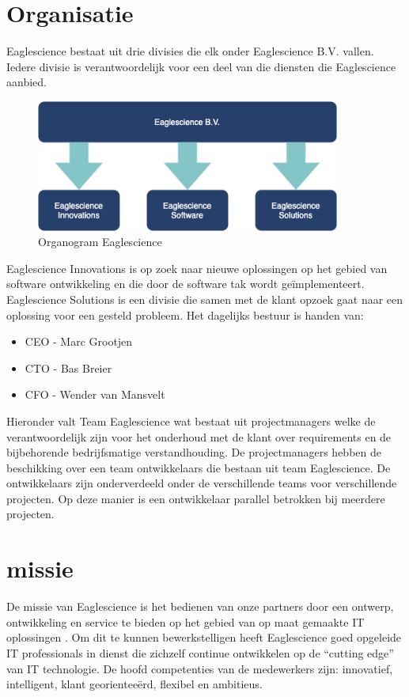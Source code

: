 \section{Organisatie}
Eaglescience bestaat uit drie divisies die elk onder Eaglescience B.V. vallen. Iedere divisie is verantwoordelijk voor een deel van die diensten die Eaglescience aanbied. 
\begin{figure}[bth]
\myfloatalign
\includegraphics[width=10cm]{gfx/organogram}
\caption{Organogram Eaglescience}
\label{fig:Eaglescience organogram}
\end{figure}
Eaglescience Innovations is op zoek naar nieuwe oplossingen op het gebied van software ontwikkeling en  die door de software tak wordt ge\"implementeert. Eaglescience Solutions is een divisie die samen met de klant opzoek gaat naar 
een oplossing voor een gesteld probleem.  
Het dagelijks bestuur is handen van: 
\begin{itemize}
\item CEO - Marc Grootjen
\item CTO - Bas Breier
\item CFO - Wender van Mansvelt \\
\end{itemize}
Hieronder valt Team Eaglescience wat bestaat uit projectmanagers welke de verantwoordelijk zijn voor het onderhoud met de klant over requirements en de bijbehorende bedrijfsmatige verstandhouding. De projectmanagers hebben de beschikking over een team ontwikkelaars die bestaan uit team Eaglescience. De ontwikkelaars zijn onderverdeeld onder de verschillende teams voor verschillende projecten. Op deze manier is een ontwikkelaar parallel betrokken bij meerdere projecten. 
 
\section{missie}
De missie van Eaglescience is het bedienen van onze partners door een ontwerp, ontwikkeling en service te bieden op het gebied van op maat gemaakte IT oplossingen . Om dit te kunnen bewerkstelligen heeft Eaglescience goed opgeleide IT professionals in dienst die zichzelf continue ontwikkelen op de “cutting edge” van IT technologie. De hoofd competenties van de medewerkers zijn: innovatief, intelligent, klant georientee\"erd, flexibel en ambitieus.

